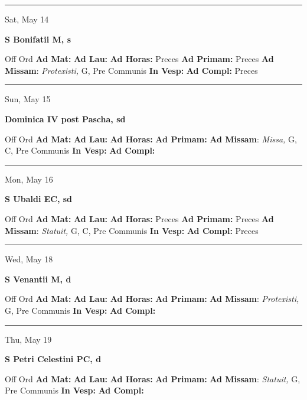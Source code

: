 \documentclass[letterpaper, 10pt]{article}
\begin{document}
\hrule
\begin{center}
Sat, May 14
\end{center}\textbf{ \large S Bonifatii M, \textnormal{\normalsize s}}
\begin{justify}
Off Ord
\textbf{Ad Mat: }
\textbf{Ad Lau: }
\textbf{Ad Horas: }Preces
\textbf{Ad Primam: }Preces
\textbf{Ad Missam}: \textit{Protexisti,} G, Pre Communis
\textbf{In Vesp: }
\textbf{Ad Compl: }Preces\end{justify}



\hrule
\begin{center}
Sun, May 15
\end{center}\textbf{ \large Dominica IV post Pascha, \textnormal{\normalsize sd}}
\begin{justify}
Off Ord
\textbf{Ad Mat: }
\textbf{Ad Lau: }
\textbf{Ad Horas: }
\textbf{Ad Primam: }
\textbf{Ad Missam}: \textit{Missa,} G, C, Pre Communis
\textbf{In Vesp: }
\textbf{Ad Compl: }\end{justify}



\hrule
\begin{center}
Mon, May 16
\end{center}\textbf{ \large S Ubaldi EC, \textnormal{\normalsize sd}}
\begin{justify}
Off Ord
\textbf{Ad Mat: }
\textbf{Ad Lau: }
\textbf{Ad Horas: }Preces
\textbf{Ad Primam: }Preces
\textbf{Ad Missam}: \textit{Statuit,} G, C, Pre Communis
\textbf{In Vesp: }
\textbf{Ad Compl: }Preces\end{justify}



\hrule
\begin{center}
Wed, May 18
\end{center}\textbf{ \large S Venantii M, \textnormal{\normalsize d}}
\begin{justify}
Off Ord
\textbf{Ad Mat: }
\textbf{Ad Lau: }
\textbf{Ad Horas: }
\textbf{Ad Primam: }
\textbf{Ad Missam}: \textit{Protexisti,} G, Pre Communis
\textbf{In Vesp: }
\textbf{Ad Compl: }\end{justify}



\hrule
\begin{center}
Thu, May 19
\end{center}\textbf{ \large S Petri Celestini PC, \textnormal{\normalsize d}}
\begin{justify}
Off Ord
\textbf{Ad Mat: }
\textbf{Ad Lau: }
\textbf{Ad Horas: }
\textbf{Ad Primam: }
\textbf{Ad Missam}: \textit{Statuit,} G, Pre Communis
\textbf{In Vesp: }
\textbf{Ad Compl: }\end{justify}
\end{document}
